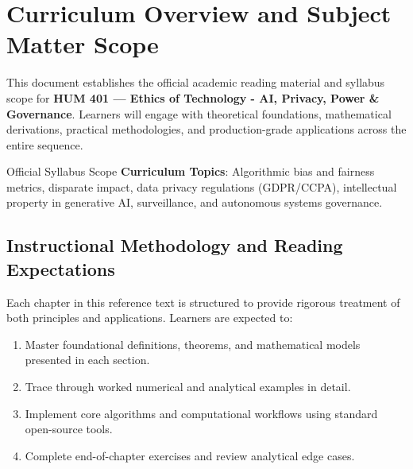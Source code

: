 \section{Curriculum Overview and Subject Matter Scope}

This document establishes the official academic reading material and syllabus scope for \textbf{HUM 401 --- Ethics of Technology - AI, Privacy, Power \& Governance}. Learners will engage with theoretical foundations, mathematical derivations, practical methodologies, and production-grade applications across the entire sequence.

\begin{InsightBox}{Official Syllabus Scope}
  \textbf{Curriculum Topics}: Algorithmic bias and fairness metrics, disparate impact, data privacy regulations (GDPR/CCPA), intellectual property in generative AI, surveillance, and autonomous systems governance.
\end{InsightBox}

\subsection{Instructional Methodology and Reading Expectations}

Each chapter in this reference text is structured to provide rigorous treatment of both principles and applications. Learners are expected to:
\begin{enumerate}
  \item Master foundational definitions, theorems, and mathematical models presented in each section.
  \item Trace through worked numerical and analytical examples in detail.
  \item Implement core algorithms and computational workflows using standard open-source tools.
  \item Complete end-of-chapter exercises and review analytical edge cases.
\end{enumerate}

